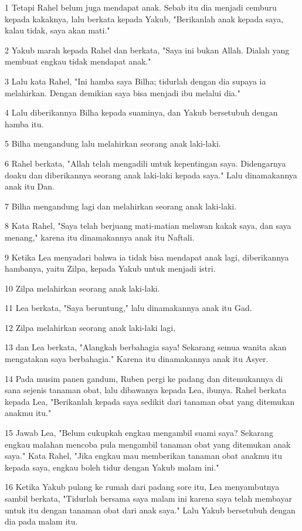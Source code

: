 \par 1 Tetapi Rahel belum juga mendapat anak. Sebab itu dia menjadi cemburu kepada kakaknya, lalu berkata kepada Yakub, "Berikanlah anak kepada saya, kalau tidak, saya akan mati."
\par 2 Yakub marah kepada Rahel dan berkata, "Saya ini bukan Allah. Dialah yang membuat engkau tidak mendapat anak."
\par 3 Lalu kata Rahel, "Ini hamba saya Bilha; tidurlah dengan dia supaya ia melahirkan. Dengan demikian saya bisa menjadi ibu melalui dia."
\par 4 Lalu diberikannya Bilha kepada suaminya, dan Yakub bersetubuh dengan hamba itu.
\par 5 Bilha mengandung lalu melahirkan seorang anak laki-laki.
\par 6 Rahel berkata, "Allah telah mengadili untuk kepentingan saya. Didengarnya doaku dan diberikannya seorang anak laki-laki kepada saya." Lalu dinamakannya anak itu Dan.
\par 7 Bilha mengandung lagi dan melahirkan seorang anak laki-laki.
\par 8 Kata Rahel, "Saya telah berjuang mati-matian melawan kakak saya, dan saya menang," karena itu dinamakannya anak itu Naftali.
\par 9 Ketika Lea menyadari bahwa ia tidak bisa mendapat anak lagi, diberikannya hambanya, yaitu Zilpa, kepada Yakub untuk menjadi istri.
\par 10 Zilpa melahirkan seorang anak laki-laki.
\par 11 Lea berkata, "Saya beruntung," lalu dinamakannya anak itu Gad.
\par 12 Zilpa melahirkan seorang anak laki-laki lagi,
\par 13 dan Lea berkata, "Alangkah berbahagia saya! Sekarang semua wanita akan mengatakan saya berbahagia." Karena itu dinamakannya anak itu Asyer.
\par 14 Pada musim panen gandum, Ruben pergi ke padang dan ditemukannya di sana sejenis tanaman obat, lalu dibawanya kepada Lea, ibunya. Rahel berkata kepada Lea, "Berikanlah kepada saya sedikit dari tanaman obat yang ditemukan anakmu itu."
\par 15 Jawab Lea, "Belum cukupkah engkau mengambil suami saya? Sekarang engkau malahan mencoba pula mengambil tanaman obat yang ditemukan anak saya." Kata Rahel, "Jika engkau mau memberikan tanaman obat anakmu itu kepada saya, engkau boleh tidur dengan Yakub malam ini."
\par 16 Ketika Yakub pulang ke rumah dari padang sore itu, Lea menyambutnya sambil berkata, "Tidurlah bersama saya malam ini karena saya telah membayar untuk itu dengan tanaman obat dari anak saya." Lalu Yakub bersetubuh dengan dia pada malam itu.
